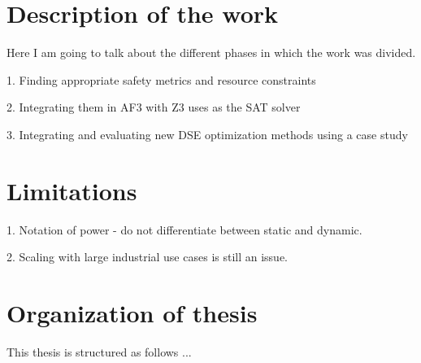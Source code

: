 \section{Description of the work}

Here I am going to talk about the different phases in which the work was divided. 

1. Finding appropriate safety metrics and resource constraints

2. Integrating them in AF3 with Z3 uses as the SAT solver

3. Integrating and evaluating new DSE optimization methods using a case study 

\section{Limitations}

1. Notation of power - do not differentiate between static and dynamic.

2. Scaling with large industrial use cases is still an issue.

\section{Organization of thesis}

This thesis is structured as follows ...

